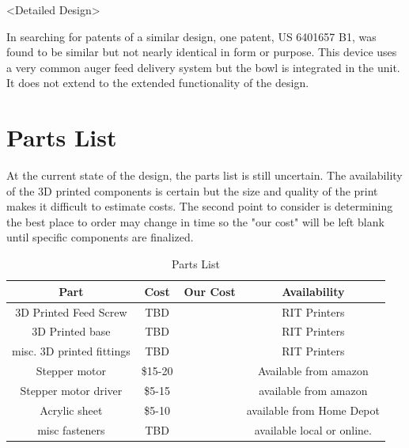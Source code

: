 \documentclass[12pt]{article}
\begin{document}
<Detailed Design>

In searching for patents of a similar design, one patent, US 6401657 B1, was found to be similar but not nearly identical in form or purpose. This device uses a very common auger feed delivery system but the bowl is integrated in the unit. It does not extend to the extended functionality of the design. 

\section{Parts List}
    At the current state of the design, the parts list is still uncertain. The availability of the 3D printed
    components is certain but the size and quality of the print makes it difficult to estimate costs. 
    The second point to consider is determining the best place to order may change in time so the "our cost" 
    will be left blank until specific components are finalized.
    \begin{table}[h]
\caption{Parts List} %
\centering %
\begin{tabular}{c c c c} %
\hline\hline %
    Part & Cost & Our Cost & Availability \\ %
\hline %
    3D Printed Feed Screw & TBD& & RIT Printers \\
    3D Printed base & TBD& & RIT Printers\\
    misc. 3D printed fittings & TBD& & RIT Printers\\
    Stepper motor & \$15-20 & & Available from amazon \\
    Stepper motor driver & \$5-15 & & available from amazon \\
    Acrylic sheet & \$5-10 & & available from Home Depot \\
    misc fasteners & TBD & & available local or online. \\

    \hline %
\end{tabular}
\label{table:bom} %
\end{table}
\end{document}
